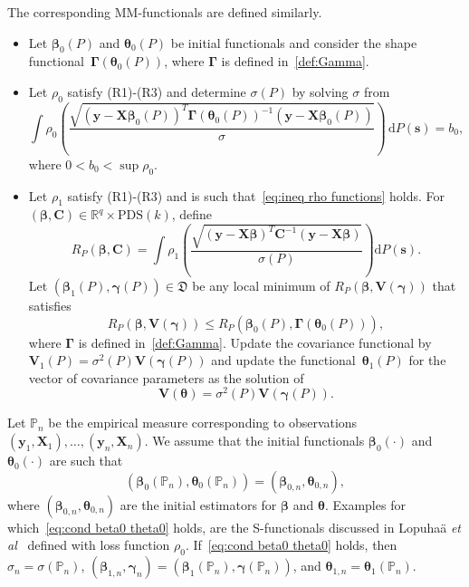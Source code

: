 \documentclass{article}
\numberwithin{equation}{section}
\theoremstyle{plain}
\newcommand{\R}{\mathbb{R}}
\newcommand{\bbeta}{\bm\beta}
\newcommand{\btheta}{\bm\theta}
\newcommand{\bgamma}{\bm\gamma}
\newcommand{\bGamma}{\bm\Gamma}
\newcommand{\by}{\mathbf{y}}
\newcommand{\bs}{\mathbf{s}}
\newcommand{\bX}{\mathbf{X}}
\newcommand{\bV}{\mathbf{V}}
\newcommand{\bC}{\mathbf{C}}
\begin{document}
The corresponding MM-functionals are defined similarly.
\begin{itemize}
\item[STAGE 1:]
Let $\bbeta_0(P)$ and $\btheta_0(P)$ be initial functionals and consider the shape functional~$\bGamma(\btheta_0(P))$, where $\bGamma$ is defined in~\eqref{def:Gamma}.
\item[STAGE 2:]
Let $\rho_0$ satisfy (R1)-(R3) and
determine $\sigma(P)$ by solving $\sigma$ from
\begin{equation}
\label{def:sigma}
\int
\rho_0
\left(
\frac{\displaystyle\sqrt{(\by-\bX\bbeta_0(P))^T\bGamma(\btheta_0(P))^{-1}(\by-\bX\bbeta_0(P))}}{\sigma}
\right)
\,
\text{d}P(\bs)
=
b_0,
\end{equation}
where $0<b_0<\sup\rho_0$.
\item[STAGE 3:]
Let $\rho_1$ satisfy (R1)-(R3) and is such that~\eqref{eq:ineq rho functions} holds.
For $(\bbeta,\bC)\in\R^q\times\text{PDS}(k)$, define
\begin{equation}
\label{def:R_P}
R_P(\bbeta,\bC)
=
\int
\rho_1\left(
\frac{\displaystyle\sqrt{(\by-\bX\bbeta)^T\bC^{-1}(\by-\bX\bbeta)}}{\sigma(P)}
\right)
\text{d}P(\bs).
\end{equation}
Let $(\bbeta_1(P),\bgamma(P))\in \mathfrak{D}$ be any local minimum of
$R_P(\bbeta,\bV(\bgamma))$
that satisfies
\begin{equation}
\label{eq:ineq RP}
R_{P}(\bbeta,\bV(\bgamma))
\leq
R_{P}(\bbeta_0(P),\bGamma(\btheta_0(P))),
\end{equation}
where $\bGamma$ is defined in~\eqref{def:Gamma}.
Update the covariance functional by
$\bV_1(P)=\sigma^2(P)\bV(\bgamma(P))$
and update the functional~$\btheta_1(P)$ for the vector of covariance parameters as the solution of
\begin{equation}
\label{def:theta1}
\bV(\btheta)=\sigma^2(P)\bV(\bgamma(P)).
\end{equation}
\end{itemize}

Let $\mathbb{P}_n$ be the empirical measure corresponding to observations $(\by_1,\bX_1),\ldots,(\by_n,\bX_n)$.
We assume that the initial functionals $\bbeta_0(\cdot)$ and $\btheta_0(\cdot)$ are such that
\begin{equation}
\label{eq:cond beta0 theta0}
(\bbeta_0(\mathbb{P}_n),\btheta_0(\mathbb{P}_n))=(\bbeta_{0,n},\btheta_{0,n}),
\end{equation}
where $(\bbeta_{0,n},\btheta_{0,n})$ are the initial estimators for $\bbeta$ and $\btheta$.
Examples for which~\eqref{eq:cond beta0 theta0} holds, are the S-functionals discussed in 
Lopuha\"a \textit{et al}~\cite{lopuhaa-gares-ruizgazen2023} defined with loss function $\rho_0$.
If~\eqref{eq:cond beta0 theta0} holds, then 
$\sigma_n=\sigma(\mathbb{P}_n)$, $(\bbeta_{1,n},\bgamma_n)=(\bbeta_1(\mathbb{P}_n),\bgamma(\mathbb{P}_n))$, 
and $\btheta_{1,n}=\btheta_1(\mathbb{P}_n)$.
\end{document}
